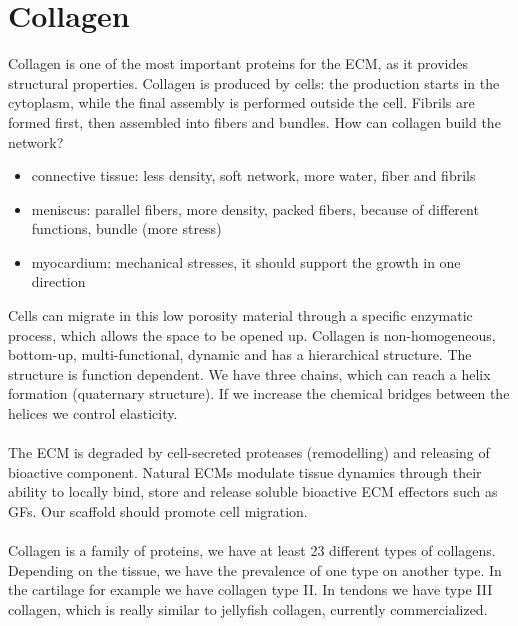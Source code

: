 \section{Collagen}
Collagen is one of the most important proteins for the ECM, as it provides structural properties. Collagen is produced by cells: the production starts in the cytoplasm,  while the final assembly is performed outside the cell.
Fibrils are formed first, then assembled into fibers and bundles.
\noindent
How can collagen build the network?
\begin{itemize}
\item connective tissue: less density, soft network, more water, fiber and fibrils
\item meniscus: parallel fibers, more density, packed fibers, because of different functions, bundle (more stress)
\item myocardium: mechanical stresses, it should support the growth in one direction
\end{itemize}
\noindent
Cells can migrate in this low porosity material through a specific enzymatic process,  which allows the space to be opened up.
Collagen is non-homogeneous, bottom-up, multi-functional, dynamic and has a hierarchical structure. The structure is function dependent.
We have three chains,  which can reach a helix formation (quaternary structure). If we increase the chemical bridges between the helices we control elasticity.
\\
\\
\noindent
The ECM is degraded by cell-secreted proteases (remodelling) and releasing of bioactive component.
Natural ECMs modulate tissue dynamics through their ability to locally bind, store and release soluble bioactive ECM effectors such as GFs.
Our scaffold should promote cell migration.
\\
\\
\noindent
Collagen is a family of proteins, we have at least 23 different types of collagens. Depending on the tissue, we have the prevalence of one type on another type. In the cartilage for example we have collagen type II. In tendons we have type III collagen, which is really similar to jellyfish collagen, currently commercialized.

